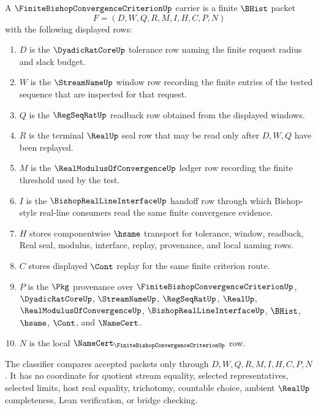 \begin{definition}
\label{def:finite-bishop-convergence-criterion-carrier}
A $\FiniteBishopConvergenceCriterionUp$ carrier is a finite $\BHist$ packet
$$
F=(D,W,Q,R,M,I,H,C,P,N)
$$
with the following displayed rows:
\begin{enumerate}
\item $D$ is the $\DyadicRatCoreUp$ tolerance row naming the finite request radius and slack budget.
\item $W$ is the $\StreamNameUp$ window row recording the finite entries of the tested sequence that are inspected for that request.
\item $Q$ is the $\RegSeqRatUp$ readback row obtained from the displayed windows.
\item $R$ is the terminal $\RealUp$ seal row that may be read only after $D,W,Q$ have been replayed.
\item $M$ is the $\RealModulusOfConvergenceUp$ ledger row recording the finite threshold used by the test.
\item $I$ is the $\BishopRealLineInterfaceUp$ handoff row through which Bishop-style real-line consumers read the same finite convergence evidence.
\item $H$ stores componentwise $\hsame$ transport for tolerance, window, readback, Real seal, modulus, interface, replay, provenance, and local naming rows.
\item $C$ stores displayed $\Cont$ replay for the same finite criterion route.
\item $P$ is the $\Pkg$ provenance over $\FiniteBishopConvergenceCriterionUp$, $\DyadicRatCoreUp$, $\StreamNameUp$, $\RegSeqRatUp$, $\RealUp$, $\RealModulusOfConvergenceUp$, $\BishopRealLineInterfaceUp$, $\BHist$, $\hsame$, $\Cont$, and $\NameCert$.
\item $N$ is the local $\NameCert_{\FiniteBishopConvergenceCriterionUp}$ row.
\end{enumerate}
The classifier compares accepted packets only through $D,W,Q,R,M,I,H,C,P,N$. It has no coordinate for quotient stream equality, selected representatives, selected limits, host real equality, trichotomy, countable choice, ambient $\RealUp$ completeness, Lean verification, or bridge checking.
\end{definition}

